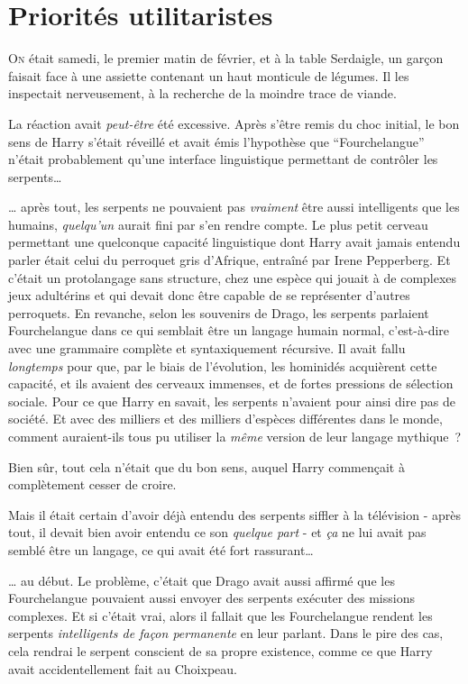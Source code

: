 \chapter{Priorités utilitaristes}

\lettrine{O}{n} était samedi, le premier matin de février, et à la table Serdaigle, un garçon faisait face à une assiette contenant un haut monticule de légumes. Il les inspectait nerveusement, à la recherche de la moindre trace de viande.

La réaction avait \emph{peut-être} été excessive. Après s'être remis du choc initial, le bon sens de Harry s'était réveillé et avait émis l'hypothèse que “Fourchelangue” n'était probablement qu'une interface linguistique permettant de contrôler les serpents…

… après tout, les serpents ne pouvaient pas \emph{vraiment} être aussi intelligents que les humains, \emph{quelqu'un} aurait fini par s'en rendre compte. Le plus petit cerveau permettant une quelconque capacité linguistique dont Harry avait jamais entendu parler était celui du perroquet gris d'Afrique, entraîné par Irene Pepperberg. Et c'était un protolangage sans structure, chez une espèce qui jouait à de complexes jeux adultérins et qui devait donc être capable de se représenter d'autres perroquets. En revanche, selon les souvenirs de Drago, les serpents parlaient Fourchelangue dans ce qui semblait être un langage humain normal, c'est-à-dire avec une grammaire complète et syntaxiquement récursive. Il avait fallu \emph{longtemps} pour que, par le biais de l'évolution, les hominidés acquièrent cette capacité, et ils avaient des cerveaux immenses, et de fortes pressions de sélection sociale. Pour ce que Harry en savait, les serpents n'avaient pour ainsi dire pas de société. Et avec des milliers et des milliers d'espèces différentes dans le monde, comment auraient-ils tous pu utiliser la \emph{même} version de leur langage mythique~?

Bien sûr, tout cela n'était que du bon sens, auquel Harry commençait à complètement cesser de croire.

Mais il était certain d'avoir déjà entendu des serpents siffler à la télévision - après tout, il devait bien avoir entendu ce son \emph{quelque part} - et \emph{ça} ne lui avait pas semblé être un langage, ce qui avait été fort rassurant…

… au début. Le problème, c'était que Drago avait aussi affirmé que les Fourchelangue pouvaient aussi envoyer des serpents exécuter des missions complexes. Et si c'était vrai, alors il fallait que les Fourchelangue rendent les serpents \emph{intelligents de façon permanente} en leur parlant. Dans le pire des cas, cela rendrai le serpent conscient de sa propre existence, comme ce que Harry avait accidentellement fait au Choixpeau.


